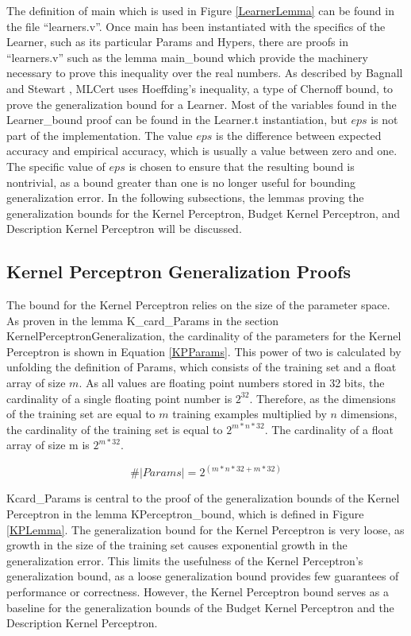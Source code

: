 The definition of main which is used in Figure \ref{LearnerLemma} can be found in the file ``learners.v''. Once main has been instantiated with the specifics of the Learner, such as its particular Params and Hypers, there are proofs in ``learners.v'' such as the lemma main\_bound which provide the machinery necessary to prove this inequality over the real numbers. As described by Bagnall and Stewart \cite{BS19}, MLCert uses Hoeffding's inequality, a type of Chernoff bound, to prove the generalization bound for a Learner. Most of the variables found in the Learner\_bound proof can be found in the Learner.t instantiation, but $\mathit{eps}$ is not part of the implementation. The value $\mathit{eps}$ is the difference between expected accuracy and empirical accuracy, which is usually a value between zero and one. The specific value of $\mathit{eps}$ is chosen to ensure that the resulting bound is nontrivial, as a bound greater than one is no longer useful for bounding generalization error. In the following subsections, the lemmas proving the generalization bounds for the Kernel Perceptron, Budget Kernel Perceptron, and Description Kernel Perceptron will be discussed.
\subsection{Kernel Perceptron Generalization Proofs}\label{KPProofs}
The bound for the Kernel Perceptron relies on the size of the parameter space. As proven in the lemma K\_card\_Params in the section KernelPerceptronGeneralization, the cardinality of the parameters for the Kernel Perceptron is shown in Equation \ref{KPParams}. This power of two is calculated by unfolding the definition of Params, which consists of the training set and a float array of size $m$. As all values are floating point numbers stored in 32 bits, the cardinality of a single floating point number is $2^{32}$. Therefore, as the dimensions of the training set are equal to $m$ training examples multiplied by $n$ dimensions, the cardinality of the training set is equal to $2^{m*n*32}$. The cardinality of a float array of size m is $2^{m * 32}$. 

\begin{equation} \label{KPParams}
 \#|Params| = 2^{(m*n*32 + m*32)}
\end{equation}

Kcard\_Params is central to the proof of the generalization bounds of the Kernel Perceptron in the lemma KPerceptron\_bound, which is defined in Figure \ref{KPLemma}. The generalization bound for the Kernel Perceptron is very loose, as growth in the size of the training set causes exponential growth in the generalization error. This limits the usefulness of the Kernel Perceptron's generalization bound, as a loose generalization bound provides few guarantees of performance or correctness. However, the Kernel Perceptron bound serves as a baseline for the generalization bounds of the Budget Kernel Perceptron and the Description Kernel Perceptron.

